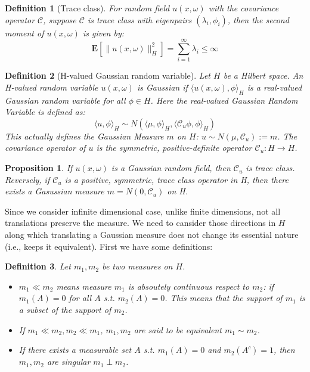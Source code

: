 \documentclass{article}
\newtheorem{definition}{Definition}
\newtheorem{proposition}{Proposition}
\begin{document}
\begin{definition}[Trace class]\label{thmtraceclass}
  For random field $u(x,\omega)$ with the covariance operator $\mathcal{C}$, suppose $\mathcal{C}$ is trace class with eigenpairs $(\lambda_i, \phi_i)$, 
  then the second moment of $u(x, \omega)$ is given by:
  \begin{equation}
    \mathbf{E}[\|u(x, \omega)\|^2_H] = \sum_{i=1}^{\infty} \lambda_i\leq \infty
  \end{equation}
\end{definition}

\begin{definition}[H-valued Gaussian random variable]
  Let $H$ be a Hilbert space. An H-valued random variable $u(x, \omega)$ is Gaussian if 
  $\langle u(x, \omega), \phi\rangle_H$ is a real-valued Gaussian random variable for all $\phi \in H$.
  Here the real-valued Gaussian Random Variable is defined as:
  \begin{equation}
    \langle u, \phi\rangle_H \sim N(\langle \mu, \phi\rangle_H, \langle \mathcal{C}_u\phi, \phi\rangle_H)
  \end{equation}
  This actually defines the Gaussian Measure $m$ on $H$: $u\sim N(\mu, \mathcal{C}_u):= m$. 
  The covariance operator of $u$ is the symmetric, positive-definite operator $\mathcal{C}_u : H \rightarrow H$.
\end{definition}

\begin{proposition}
  If $u(x, \omega)$ is a Gaussian random field, then $\mathcal{C}_u$ is trace class. 
  Reversely, if $\mathcal{C}_u$ is a positive, symmetric, trace class operator in H, then there exists a Gasussian measure $m=N(0, \mathcal{C}_u)$ on H.
\end{proposition}

Since we consider infinite dimensional case, unlike finite dimensions, not all translations preserve the measure. 
We need to cansider those directions in $H$ along which translating a Gaussian measure does not change its essential nature (i.e., keeps it equivalent). 
First we have some definitions:
\begin{definition}
  Let $m_1, m_2$ be two measures on $H$.
  \begin{itemize}
    \item $m_1 \ll m_2$ means measure $m_1$ is absoutely continuous respect to $m_2$: if $m_1(A) = 0$ for all $A$ s.t. $m_2(A) = 0$. 
     This means that the support of $m_1$ is a subset of the support of $m_2$.
    \item If $m_1 \ll m_2, m_2 \ll m_1$, $m_1, m_2$ are said to be equivalent $m_1 \sim m_2$.
    \item If there exists a measurable set $A$ s.t. $m_1(A) = 0$ and $m_2(A^c) =1$, then $m_1, m_2$ are singular $m_1 \perp m_2$. 
  \end{itemize}
\end{definition}
\end{document}
